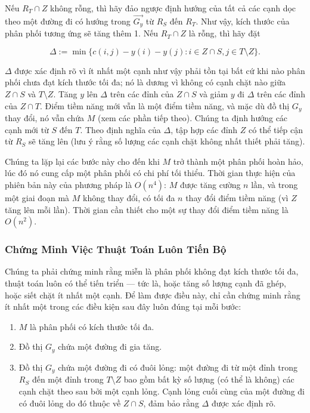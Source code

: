 Nếu \( R_T \cap Z \) không rỗng, thì hãy đảo ngược định hướng của tất cả các cạnh dọc theo một đường đi có hướng trong \( \overrightarrow{G_y} \) từ \( R_S \) đến \( R_T \). Như vậy, kích thước của phân phối tương ứng sẽ tăng thêm 1.
Nếu \( R_T \cap Z \) là rỗng, thì hãy đặt

\[
\Delta := \min \{ c(i, j) - y(i) - y(j) : i \in Z \cap S, j \in T \setminus Z \}.
\]

\(\Delta\) được xác định rõ vì ít nhất một cạnh như vậy phải tồn tại bất cứ khi nào phân phối chưa đạt kích thước tối đa; nó là dương vì không có cạnh chặt nào giữa \( Z \cap S \) và \( T \setminus Z \). Tăng \( y \) lên \(\Delta\) trên các đỉnh của \( Z \cap S \) và giảm \( y \) đi \(\Delta\) trên các đỉnh của \( Z \cap T \). Điểm tiềm năng mới vẫn là một điểm tiềm năng, và mặc dù đồ thị \( G_y \) thay đổi, nó vẫn chứa \( M \) (xem các phần tiếp theo). Chúng ta định hướng các cạnh mới từ \( S \) đến \( T \). Theo định nghĩa của \(\Delta\), tập hợp các đỉnh \( Z \) có thể tiếp cận từ \( R_S \) sẽ tăng lên (lưu ý rằng số lượng các cạnh chặt không nhất thiết phải tăng).

Chúng ta lặp lại các bước này cho đến khi \( M \) trở thành một phân phối hoàn hảo, lúc đó nó cung cấp một phân phối có chi phí tối thiểu. Thời gian thực hiện của phiên bản này của phương pháp là \( O(n^4) \): \( M \) được tăng cường \( n \) lần, và trong một giai đoạn mà \( M \) không thay đổi, có tối đa \( n \) thay đổi điểm tiềm năng (vì \( Z \) tăng lên mỗi lần). Thời gian cần thiết cho một sự thay đổi điểm tiềm năng là \( O(n^2) \).

\subsubsection{Chứng Minh Việc Thuật Toán Luôn Tiến Bộ}

Chúng ta phải chứng minh rằng miễn là phân phối không đạt kích thước tối đa, thuật toán luôn có thể tiến triển — tức là, hoặc tăng số lượng cạnh đã ghép, hoặc siết chặt ít nhất một cạnh. Để làm được điều này, chỉ cần chứng minh rằng ít nhất một trong các điều kiện sau đây luôn đúng tại mỗi bước:

\begin{enumerate}
    \item \( M \) là phân phối có kích thước tối đa.
    \item Đồ thị \( G_y \) chứa một đường đi gia tăng.
    \item Đồ thị \( G_y \) chứa một đường đi có đuôi lỏng: một đường đi từ một đỉnh trong \( R_S \) đến một đỉnh trong \( T \setminus Z \) bao gồm bất kỳ số lượng (có thể là không) các cạnh chặt theo sau bởi một cạnh lỏng. Cạnh lỏng cuối cùng của một đường đi có đuôi lỏng do đó thuộc về \( Z \cap S \), đảm bảo rằng \(\Delta\) được xác định rõ.
\end{enumerate}

